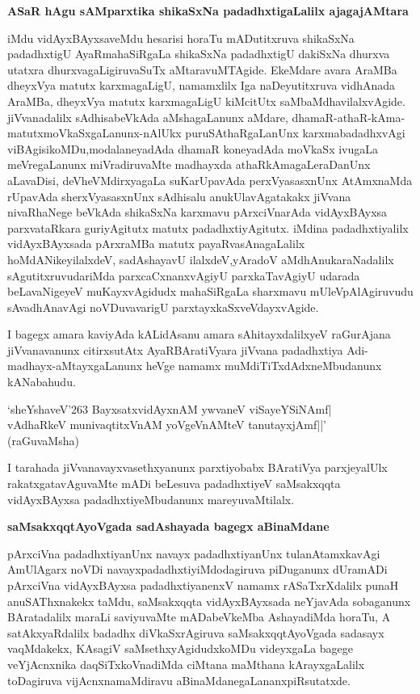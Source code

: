 {\bigskip
\noindent
{\large\bf ASaR hAgu sAMparxtika shikaSxNa padadhxtigaLalilx ajagajAMtara}}\label{page28}
\medskip

\noindent
iMdu vidAyxBAyxsaveMdu hesarisi horaTu mADutitxruva shikaSxNa padadhxtigU AyaR\-mahaSiRgaLa shikaSxNa padadhxtigU dakiSxNa dhurxva utatxra dhurxvagaLigiruvaSuTx aMtara\-vuMTA\-gide. EkeMdare avara AraMBa dheyxVya matutx karxmagaLigU, namamxlilx Iga naDeyu\-titxruva vidhAnada AraMBa, dheyxVya matutx karxmagaLigU kiMcitUtx\- saMbaMdhavilalxvAgide. jiVvanadalilx sAdhisabeVkAda aMshagaLanunx aMdare, dhamaR-athaR-kAma\--matutx\break moVkaSxgaLanunx-nAlUkx puruSAthaRgaLanUnx karxmabadadhxvAgi viBAgisikoMDu,\break modalaneyadAda dhamaR koneyadAda moVkaSx ivugaLa meVregaLanunx miVradiru\-vaMte madhayxda athaRkAmagaLeraDanUnx aLa\-vaDisi, deVheVMdirxyagaLa suKarUpavAda perxVyasasxnUnx AtAmxnaMda rUpavAda sherxVyasasxnUnx sAdhi\-salu anu\-kUla\-vAga\-takakx jiVvana nivaRhaNege beVkAda shikaSxNa karxmavu pArxciVnarAda vidAyxBAyxsa parxvataR\-kara guri\-yAgitutx matutx padadhxtiyAgitutx. iMdina padadhxtiyalilx vidAyxBAyxsada pArxraMBa matutx payaRvasAna\-gaLalilx hoMdANikeyilalxdeV, sadAshayavU ilalxdeV,\break yAradoV aMdhAnukaraNadalilx sAgutitxruvudariMda parxcaCx\-nanxvAgiyU parxkaTa\break\-vAgiyU uda\-rada beLavaNigeyeV muKayxvAgidudx mahaSiRgaLa sharxmavu mUleV\-pAlA\-giru\-vudu sAva\-dhAnavAgi noVDuvavarigU parxtayxkaSxveVdayxvAgide.

I bagegx amara kaviyAda kALidAsanu amara sAhitayxdalilxyeV raGurAjana jiVvanavanunx citirxsutAtx AyaRBAratiVyara jiVvana padadhxtiya Adi-madhayx-aMtayx\-gaLanunx heVge namamx muMdiTiTxdAdxneMbudanunx kANabahudu.

\medskip
\begin{shloka}
`sheYshaveV\char'263 BayxsatxvidAyxnAM ywvaneV viSayeYSiNAmf|\\\label{28}
vAdhaRkeV munivaqtitxVnAM yoVgeVnAMteV tanutayxjAmf||'\\
\hfill (raGuvaMsha)
\end{shloka}

I tarahada jiVvanavayxvasethxyanunx parxtiyobabx BAratiVya parxjeyalUlx rakatxgatavAguvaMte mADi beLe\-suva padadhxtiyeV saMsakxqqta vidAyxBAyxsa padadhxtiyeMbudanunx mareyuvaMtilalx.

{\bigskip
\noindent
{\large\bf saMsakxqqtAyoVgada sadAshayada bagegx aBinaMdane}}
\medskip

\noindent
pArxciVna padadhxtiyanUnx navayx padadhxtiyanUnx tulanAtamxkavAgi AmUlAgarx noVDi navayxpadadhxtiyiM\-dodagiruva piDuganunx dUramADi pArxciVna vidAyxBAyxsa padadhxti\-yanenxV namamx rASaTxrXdalilx punaH anu\-SAThxnakekx taMdu, saMsakxqqta vidAyxBAyxsada neYjavAda sobaganunx BAratadalilx maraLi saviyuvaMte mADa\-beVkeMba
AshayadiMda horaTu, A satAkxyaRdalilx badadhx diVkaSxrAgiruva saMsakxqqtAyoVgada sadasayx vaqM\-dakekx, KAsagiV\- saMsethxyAgidudxkoMDu videyxgaLa bagege veYjAcnxnika daqSiTxkoVnadiMda ciMtana maMthana kArayx\-gaLalilx toDa\-giruva vijAcnxnamaMdiravu aBinaMdanegaLananxpiRsutatxde.

